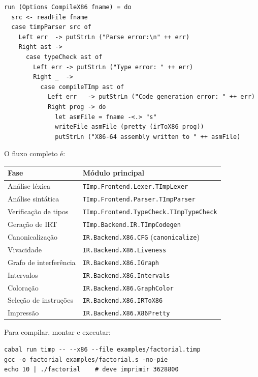 \begin{verbatim}
run (Options CompileX86 fname) = do
  src <- readFile fname
  case timpParser src of
    Left err  -> putStrLn ("Parse error:\n" ++ err)
    Right ast ->
      case typeCheck ast of
        Left err -> putStrLn ("Type error: " ++ err)
        Right _  ->
          case compileTImp ast of
            Left err   -> putStrLn ("Code generation error: " ++ err)
            Right prog -> do
              let asmFile = fname -<.> "s"
              writeFile asmFile (pretty (irToX86 prog))
              putStrLn ("X86-64 assembly written to " ++ asmFile)
\end{verbatim}

O fluxo completo é:

\begin{center}
  \begin{tabular}{ll}
    \toprule
    Fase & Módulo principal \\
    \midrule
    Análise léxica        & \texttt{TImp.Frontend.Lexer.TImpLexer} \\
    Análise sintática     & \texttt{TImp.Frontend.Parser.TImpParser} \\
    Verificação de tipos  & \texttt{TImp.Frontend.TypeCheck.TImpTypeCheck} \\
    Geração de IRT        & \texttt{TImp.Backend.IR.TImpCodegen} \\
    Canonicalização       & \texttt{IR.Backend.X86.CFG}
    (\texttt{canonicalize}) \\
    Vivacidade            & \texttt{IR.Backend.X86.Liveness} \\
    Grafo de interferência & \texttt{IR.Backend.X86.IGraph} \\
    Intervalos            & \texttt{IR.Backend.X86.Intervals} \\
    Coloração             & \texttt{IR.Backend.X86.GraphColor} \\
    Seleção de instruções & \texttt{IR.Backend.X86.IRToX86} \\
    Impressão             & \texttt{IR.Backend.X86.X86Pretty} \\
    \bottomrule
  \end{tabular}
\end{center}

Para compilar, montar e executar:

\begin{verbatim}
cabal run timp -- --x86 --file examples/factorial.timp
gcc -o factorial examples/factorial.s -no-pie
echo 10 | ./factorial    # deve imprimir 3628800
\end{verbatim}

